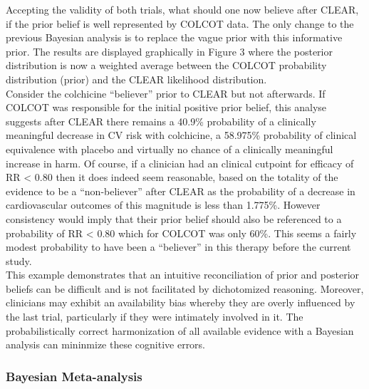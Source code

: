 \documentclass[
  letterpaper,
  DIV=11,
  numbers=noendperiod]{scrartcl}
\begin{document}
Accepting the validity of both trials, what should one now believe after
CLEAR, if the prior belief is well represented by COLCOT data. The only
change to the previous Bayesian analysis is to replace the vague prior
with this informative prior. The results are displayed graphically in
Figure 3 where the posterior distribution is now a weighted average
between the COLCOT probability distribution (prior) and the CLEAR
likelihood distribution.\\
Consider the colchicine ``believer'' prior to CLEAR but not afterwards.
If COLCOT was responsible for the initial positive prior belief, this
analyse suggests after CLEAR there remains a 40.9\% probability of a
clinically meaningful decrease in CV risk with colchicine, a 58.975\%
probability of clinical equivalence with placebo and virtually no chance
of a clinically meaningful increase in harm. Of course, if a clinician
had an clinical cutpoint for efficacy of RR \textless{} 0.80 then it
does indeed seem reasonable, based on the totality of the evidence to be
a ``non-believer'' after CLEAR as the probability of a decrease in
cardiovascular outcomes of this magnitude is less than 1.775\%. However
consistency would imply that their prior belief should also be
referenced to a probability of RR \textless{} 0.80 which for COLCOT was
only 60\%. This seems a fairly modest probability to have been a
``believer'' in this therapy before the current study.\\
This example demonstrates that an intuitive reconciliation of prior and
posterior beliefs can be difficult and is not facilitated by
dichotomized reasoning. Moreover, clinicians may exhibit an availability
bias whereby they are overly influenced by the last trial, particularly
if they were intimately involved in it. The probabilistically correct
harmonization of all available evidence with a Bayesian analysis can
mininmize these cognitive errors.\\

\subsubsection{Bayesian Meta-analysis}\label{bayesian-meta-analysis}
\end{document}
